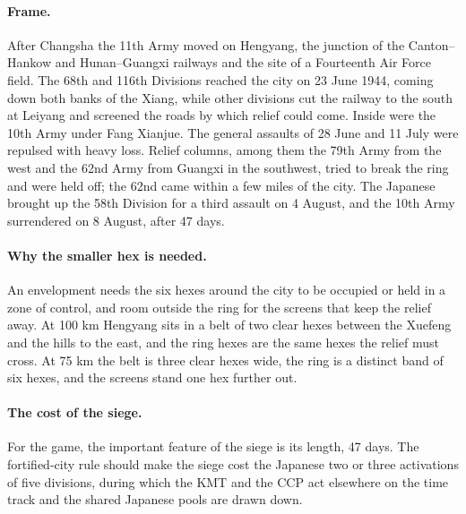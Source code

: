\paragraph{Frame.} After Changsha the 11th Army moved on Hengyang, the junction of the Canton--Hankow and Hunan--Guangxi railways and the site of a Fourteenth Air Force field. The 68th and 116th Divisions reached the city on 23 June 1944, coming down both banks of the Xiang, while other divisions cut the railway to the south at Leiyang and screened the roads by which relief could come. Inside were the 10th Army under Fang Xianjue. The general assaults of 28 June and 11 July were repulsed with heavy loss. Relief columns, among them the 79th Army from the west and the 62nd Army from Guangxi in the southwest, tried to break the ring and were held off; the 62nd came within a few miles of the city. The Japanese brought up the 58th Division for a third assault on 4 August, and the 10th Army surrendered on 8 August, after 47 days.
\paragraph{Why the smaller hex is needed.} An envelopment needs the six hexes around the city to be occupied or held in a zone of control, and room outside the ring for the screens that keep the relief away. At 100 km Hengyang sits in a belt of two clear hexes between the Xuefeng and the hills to the east, and the ring hexes are the same hexes the relief must cross. At 75 km the belt is three clear hexes wide, the ring is a distinct band of six hexes, and the screens stand one hex further out.
\paragraph{The cost of the siege.} For the game, the important feature of the siege is its length, 47 days. The fortified-city rule should make the siege cost the Japanese two or three activations of five divisions, during which the KMT and the CCP act elsewhere on the time track and the shared Japanese pools are drawn down.


